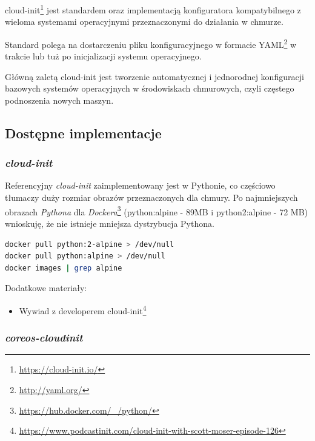 \documentclass[a4paper,12pt,twoside,openany]{report}
\providecommand{\tightlist}{%
  \setlength{\itemsep}{0pt}\setlength{\parskip}{0pt}}
\DeclareRobustCommand{\href}[2]{#2\footnote{\url{#1}}}
\begin{document}
\href{https://cloud-init.io/}{cloud-init} jest standardem oraz
implementacją konfiguratora kompatybilnego z wieloma systemami
operacyjnymi przeznaczonymi do działania w chmurze.

Standard polega na dostarczeniu pliku konfiguracyjnego w formacie
\href{http://yaml.org/}{YAML} w trakcie lub tuż po inicjalizacji systemu
operacyjnego.

Główną zaletą cloud-init jest tworzenie automatycznej i jednorodnej
konfiguracji bazowych systemów operacyjnych w środowiskach chmurowych,
czyli częstego podnoszenia nowych maszyn.

\hypertarget{dostux119pne-implementacje}{%
\subsection{Dostępne implementacje}\label{dostux119pne-implementacje}}

\hypertarget{cloud-init}{%
\subsubsection{\texorpdfstring{\emph{cloud-init}}{cloud-init}}\label{cloud-init}}

Referencyjny \emph{cloud-init} zaimplementowany jest w Pythonie, co
częściowo tłumaczy duży rozmiar obrazów przeznaczonych dla chmury. Po
najmniejszych obrazach
\href{https://hub.docker.com/_/python/}{\emph{Pythona} dla
\emph{Dockera}} (python:alpine - 89MB i python2:alpine - 72 MB)
wnioskuję, że nie istnieje mniejsza dystrybucja Pythona.

\begin{lstlisting}[language=bash]
docker pull python:2-alpine > /dev/null
docker pull python:alpine > /dev/null
docker images | grep alpine
\end{lstlisting}

Dodatkowe materiały:

\begin{itemize}
\tightlist
\item
  \href{https://www.podcastinit.com/cloud-init-with-scott-moser-episode-126}{Wywiad
  z developerem cloud-init}
\end{itemize}

\hypertarget{coreos-cloudinit}{%
\subsubsection{\texorpdfstring{\emph{coreos-cloudinit}}{coreos-cloudinit}}\label{coreos-cloudinit}}
\end{document}
